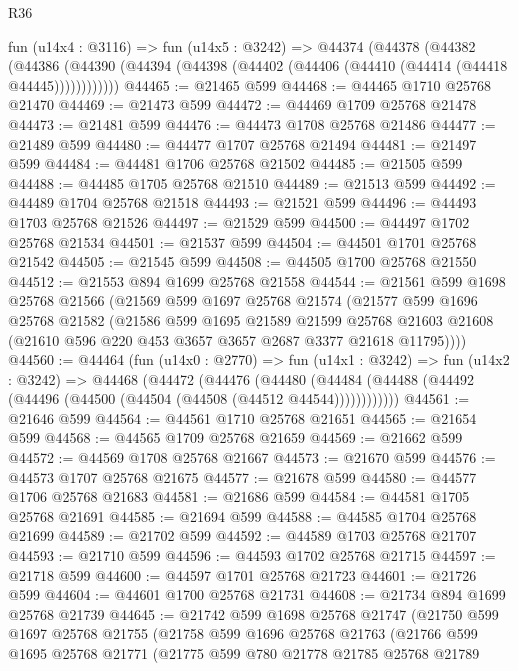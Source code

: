 \begin{lexlean}{R36}
\begin{coremodule}
    fun (u14x4 : @3116) =>
    fun (u14x5 : @3242) =>
    @44374
      (@44378
        (@44382
          (@44386 (@44390 (@44394 (@44398 (@44402 (@44406 (@44410 (@44414 (@44418 @44445))))))))))))
@44465 := @21465 @599
@44468 := @44465 @1710 @25768 @21470
@44469 := @21473 @599
@44472 := @44469 @1709 @25768 @21478
@44473 := @21481 @599
@44476 := @44473 @1708 @25768 @21486
@44477 := @21489 @599
@44480 := @44477 @1707 @25768 @21494
@44481 := @21497 @599
@44484 := @44481 @1706 @25768 @21502
@44485 := @21505 @599
@44488 := @44485 @1705 @25768 @21510
@44489 := @21513 @599
@44492 := @44489 @1704 @25768 @21518
@44493 := @21521 @599
@44496 := @44493 @1703 @25768 @21526
@44497 := @21529 @599
@44500 := @44497 @1702 @25768 @21534
@44501 := @21537 @599
@44504 := @44501 @1701 @25768 @21542
@44505 := @21545 @599
@44508 := @44505 @1700 @25768 @21550
@44512 := @21553 @894 @1699 @25768 @21558
@44544 := @21561
    @599
    @1698
    @25768
    @21566
    (@21569
      @599
      @1697
      @25768
      @21574
      (@21577
        @599
        @1696
        @25768
        @21582
        (@21586
          @599
          @1695
          @21589
          @21599
          @25768
          @21603
          @21608
          (@21610 @596 @220 @453 @3657 @3657 @2687 @3377 @21618 @11795))))
@44560 := @44464
    (fun (u14x0 : @2770) =>
    fun (u14x1 : @3242) =>
    fun (u14x2 : @3242) =>
    @44468
      (@44472
        (@44476
          (@44480 (@44484 (@44488 (@44492 (@44496 (@44500 (@44504 (@44508 (@44512 @44544))))))))))))
@44561 := @21646 @599
@44564 := @44561 @1710 @25768 @21651
@44565 := @21654 @599
@44568 := @44565 @1709 @25768 @21659
@44569 := @21662 @599
@44572 := @44569 @1708 @25768 @21667
@44573 := @21670 @599
@44576 := @44573 @1707 @25768 @21675
@44577 := @21678 @599
@44580 := @44577 @1706 @25768 @21683
@44581 := @21686 @599
@44584 := @44581 @1705 @25768 @21691
@44585 := @21694 @599
@44588 := @44585 @1704 @25768 @21699
@44589 := @21702 @599
@44592 := @44589 @1703 @25768 @21707
@44593 := @21710 @599
@44596 := @44593 @1702 @25768 @21715
@44597 := @21718 @599
@44600 := @44597 @1701 @25768 @21723
@44601 := @21726 @599
@44604 := @44601 @1700 @25768 @21731
@44608 := @21734 @894 @1699 @25768 @21739
@44645 := @21742
    @599
    @1698
    @25768
    @21747
    (@21750
      @599
      @1697
      @25768
      @21755
      (@21758
        @599
        @1696
        @25768
        @21763
        (@21766
          @599
          @1695
          @25768
          @21771
          (@21775
            @599
            @780
            @21778
            @21785
            @25768
            @21789

\end{coremodule}
\end{lexlean}
